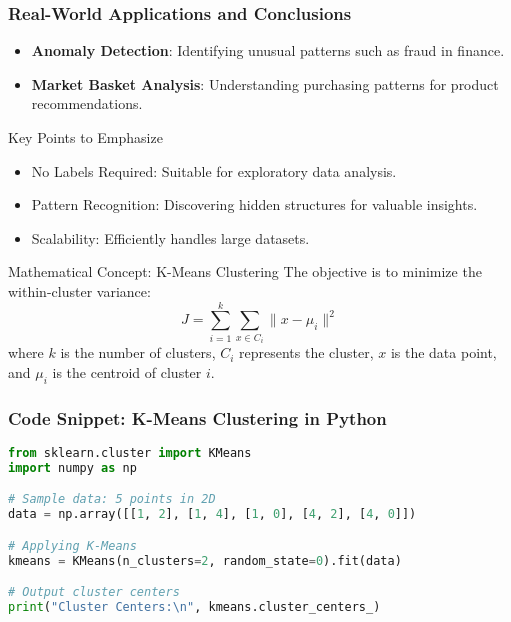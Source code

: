 \documentclass[aspectratio=169]{beamer}
\begin{document}
\begin{frame}[fragile]
    \frametitle{Real-World Applications and Conclusions}
    \begin{itemize}
        \item \textbf{Anomaly Detection}: Identifying unusual patterns such as fraud in finance.
        \item \textbf{Market Basket Analysis}: Understanding purchasing patterns for product recommendations.
    \end{itemize}
    \begin{block}{Key Points to Emphasize}
        \begin{itemize}
            \item No Labels Required: Suitable for exploratory data analysis.
            \item Pattern Recognition: Discovering hidden structures for valuable insights.
            \item Scalability: Efficiently handles large datasets.
        \end{itemize}
    \end{block}
    
    \begin{block}{Mathematical Concept: K-Means Clustering}
        The objective is to minimize the within-cluster variance:
        \begin{equation}
            J = \sum_{i=1}^{k} \sum_{x \in C_i} \| x - \mu_i \|^2
        \end{equation}
        where \( k \) is the number of clusters, \( C_i \) represents the cluster, \( x \) is the data point, and \( \mu_i \) is the centroid of cluster \( i \).
    \end{block}
\end{frame}

\begin{frame}[fragile]
    \frametitle{Code Snippet: K-Means Clustering in Python}
    \begin{lstlisting}[language=Python]
from sklearn.cluster import KMeans
import numpy as np

# Sample data: 5 points in 2D
data = np.array([[1, 2], [1, 4], [1, 0], [4, 2], [4, 0]])

# Applying K-Means
kmeans = KMeans(n_clusters=2, random_state=0).fit(data)

# Output cluster centers
print("Cluster Centers:\n", kmeans.cluster_centers_)
    \end{lstlisting}
\end{frame}
\end{document}
